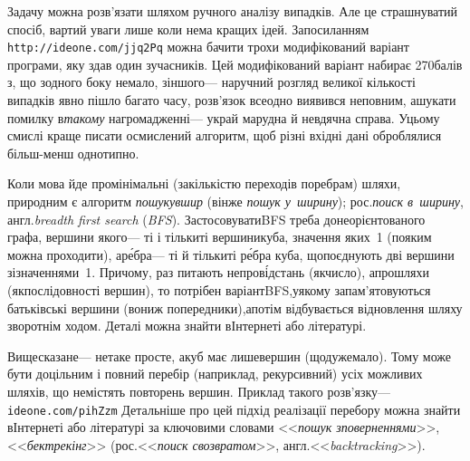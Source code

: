 \Tutorial	Задачу можна розв'язати шляхом ручного аналізу випадків. Але це страшнуватий спосіб, вартий уваги лише коли нема кращих ідей. За\nolinebreak[2] посиланням \verb"http://ideone.com/jjq2Pq" можна бачити трохи модифікований варіант програми, яку здав один з\nolinebreak[3] учасників. Цей модифікований варіант набирає 270\nolinebreak[3] балів з, що з\nolinebreak[3] одного боку немало, з\nolinebreak[3] іншого\nolinebreak[3] --- на\nolinebreak[3] ручний розгляд великої кількості випадків явно пішло багато часу, розв'язок все\nolinebreak[2] одно виявився не\nolinebreak[3] повним, а\nolinebreak[3] шукати помилку в\nolinebreak[3] \emph{такому} нагромадженні\nolinebreak[3] --- украй марудна й невдячна справа. У\nolinebreak[3] цьому смислі краще писати осмислений алгоритм, щоб різні вхідні дані оброблялися більш-менш однотипно.

{


Коли мова йде про\nolinebreak[3] мінімальні (за\nolinebreak[3] кількістю переходів по\nolinebreak[3] ребрам) шляхи, природним є алгоритм \emph{пошуку\nolinebreak[3] вшир} (він\nolinebreak[3] же \emph{пошук у~ширину}); рос.\nolinebreak[3] \emph{поиск в~ширину}, англ.\nolinebreak[3] \emph{breadth first search} (\emph{BFS}). Застосовувати\nolinebreak[2] BFS треба до\nolinebreak[3] неорієн\-то\-ваного графа, вершини якого\nolinebreak[3] --- ті і тільки\nolinebreak[3] ті вершини\nolinebreak[1] куба, значення яких~1 (по\nolinebreak[3] яким можна проходити), а\nolinebreak[3] р\'{е}бра\nolinebreak[3] --- ті й тільки\nolinebreak[3] ті р\'{е}бра куба, що\nolinebreak[3] поєднують дві вершини зі\nolinebreak[3] значеннями~1. Причому, раз питають не\nolinebreak[3] про\nolinebreak[1] в\'{і}д\-стань (як\nolinebreak[3] число), а\nolinebreak[3] про\nolinebreak[1] шляхи (як\nolinebreak[3] послідовності вершин), то потрібен варіант\nolinebreak[2] BFS,\linebreak[1] у\nolinebreak[3] якому запам'ятовуються батьківські вершини (вони\nolinebreak[3] ж попередники),\linebreak[1] а\nolinebreak[3] потім відбувається відновлення шляху зворотнім ходом. Деталі можна знайти в\nolinebreak[3] Інтернеті або літературі.

}

Вищесказане\nolinebreak[3] --- не\nolinebreak[3] таке просте, а\nolinebreak[3] куб має лише\nolinebreak[3] вершин (що\nolinebreak[3] дуже\nolinebreak[1] мало). Тому може бути доцільним і повний перебір (наприклад, рекурсивний) усіх можливих шляхів, що не\nolinebreak[3] містять повторень вершин. Приклад такого розв'язку\nolinebreak[3] --- \verb"ideone.com/pihZzm"\hspace{0.5em plus 1em} Детальніше про цей підхід реалізації перебору можна знайти в\nolinebreak[3] Інтернеті або літературі за ключовими словами <<\emph{пошук з\nolinebreak[3] поверненнями}>>, <<\emph{бектрекінг}>> (рос.\nolinebreak[3] <<\emph{поиск с\nolinebreak[3] возвратом}>>, англ.\nolinebreak[3] <<\emph{backtracking}>>).

